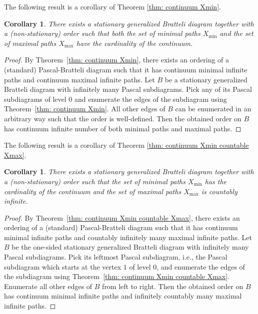 \documentclass[11pt, twoside]{amsart}
\theoremstyle{definition}
\theoremstyle{remark}
\theoremstyle{plain}
\newtheorem{corol}[definition]{Corollary}
\numberwithin{equation}{section}
\begin{document}




The following result is a corollary of Theorem \ref{thm: continuum Xmin}.

\begin{corol}\label{corol}
    There exists a stationary generalized Bratteli diagram together with a (non-stationary) order such that both the set of minimal paths $X_{\min}$ and the set of maximal paths $X_{\max}$ have the cardinality of the continuum.
\end{corol}

\begin{proof}
    By Theorem~\ref{thm: continuum Xmin}, there exists an ordering of a (standard) Pascal-Bratteli diagram such that it has continuum minimal infinite paths and continuum maximal infinite paths. Let $B$ be a stationary generalized Bratteli diagram with infinitely many Pascal subdiagrams. Pick any of its Pascal subdiagrams of level $0$ and enumerate the edges of the subdiagram using Theorem~\ref{thm: continuum Xmin}. All other edges of $B$ can be enumerated in an arbitrary way such that the order is well-defined. Then the obtained order on $B$ has continuum infinite number of both minimal paths and maximal paths.
\end{proof}

The following result is a corollary of Theorem \ref{thm: continuum Xmin countable Xmax}.

\begin{corol}\label{corol_cntbl}
    There exists a stationary generalized Bratteli diagram together with a (non-stationary) order such that the set of minimal paths $X_{\min}$ has the cardinality of the continuum and the set of maximal paths $X_{\max}$ is countably infinite.
\end{corol}

\begin{proof}
   By Theorem~\ref{thm: continuum Xmin countable Xmax}, there exists an ordering of a (standard) Pascal-Bratteli diagram such that it has continuum minimal infinite paths and countably infinitely many maximal infinite paths. Let $B$ be the one-sided stationary generalized Bratteli diagram with infinitely many Pascal subdiagrams. Pick its leftmost Pascal subdiagram, i.e., the Pascal subdiagram which starts at the vertex $1$ of level $0$, and enumerate the edges of the subdiagram using Theorem~\ref{thm: continuum Xmin countable Xmax}. Enumerate all other edges of $B$ from left to right. Then the obtained order on $B$ has continuum minimal infinite paths and infinitely countably many maximal infinite paths.
\end{proof}
\end{document}
